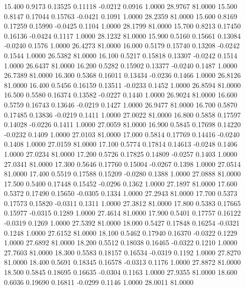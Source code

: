   15.400   0.9173   0.13525   0.11118  -0.0212   0.0916   1.0000  28.9767  81.0000
  15.500   0.8147   0.17044   0.15763  -0.0421   0.1091   1.0000  28.2359  81.0000
  15.600   0.8169   0.17259   0.15990  -0.0425   0.1104   1.0000  28.1799  81.0000
  15.700   0.8213   0.17450   0.16136  -0.0424   0.1117   1.0000  28.1232  81.0000
  15.900   0.5160   0.15661   0.13084  -0.0240   0.1576   1.0000  26.4273  81.0000
  16.000   0.5179   0.15740   0.13208  -0.0242   0.1544   1.0000  26.5382  81.0000
  16.100   0.5217   0.15818   0.13307  -0.0242   0.1514   1.0000  26.6437  81.0000
  16.200   0.5282   0.15902   0.13377  -0.0240   0.1487   1.0000  26.7389  81.0000
  16.300   0.5368   0.16011   0.13434  -0.0236   0.1466   1.0000  26.8126  81.0000
  16.400   0.5456   0.16159   0.13511  -0.0233   0.1452   1.0000  26.8594  81.0000
  16.500   0.5580   0.16374   0.13582  -0.0227   0.1440   1.0000  26.9024  81.0000
  16.600   0.5759   0.16743   0.13646  -0.0219   0.1427   1.0000  26.9477  81.0000
  16.700   0.5870   0.17485   0.13836  -0.0219   0.1411   1.0000  27.0022  81.0000
  16.800   0.5858   0.17597   0.14028  -0.0226   0.1411   1.0000  27.0059  81.0000
  16.900   0.5845   0.17698   0.14220  -0.0232   0.1409   1.0000  27.0103  81.0000
  17.000   0.5814   0.17769   0.14416  -0.0240   0.1408   1.0000  27.0159  81.0000
  17.100   0.5774   0.17814   0.14613  -0.0248   0.1406   1.0000  27.0234  81.0000
  17.200   0.5726   0.17825   0.14809  -0.0257   0.1403   1.0000  27.0341  81.0000
  17.300   0.5646   0.17760   0.15004  -0.0267   0.1398   1.0000  27.0514  81.0000
  17.400   0.5519   0.17588   0.15209  -0.0280   0.1388   1.0000  27.0888  81.0000
  17.500   0.5400   0.17448   0.15452  -0.0296   0.1362   1.0000  27.1897  81.0000
  17.600   0.5372   0.17490   0.15650  -0.0305   0.1334   1.0000  27.2943  81.0000
  17.700   0.5373   0.17573   0.15820  -0.0311   0.1311   1.0000  27.3812  81.0000
  17.800   0.5383   0.17665   0.15977  -0.0315   0.1289   1.0000  27.4614  81.0000
  17.900   0.5401   0.17757   0.16122  -0.0319   0.1269   1.0000  27.5392  81.0000
  18.000   0.5427   0.17848   0.16254  -0.0321   0.1248   1.0000  27.6152  81.0000
  18.100   0.5462   0.17940   0.16370  -0.0322   0.1229   1.0000  27.6892  81.0000
  18.200   0.5512   0.18038   0.16465  -0.0322   0.1210   1.0000  27.7603  81.0000
  18.300   0.5583   0.18157   0.16534  -0.0319   0.1192   1.0000  27.8270  81.0000
  18.400   0.5691   0.18345   0.16578  -0.0313   0.1176   1.0000  27.8872  81.0000
  18.500   0.5845   0.18695   0.16635  -0.0304   0.1163   1.0000  27.9355  81.0000
  18.600   0.6036   0.19690   0.16811  -0.0299   0.1146   1.0000  28.0011  81.0000
